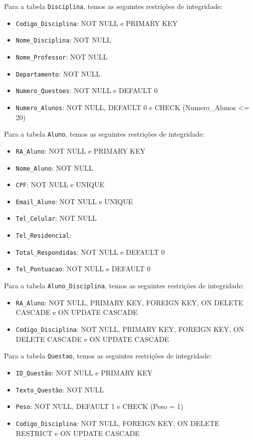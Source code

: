 \documentclass[12pt,a4paper]{article}
\begin{document}
Para a tabela \texttt{Disciplina}, temos as seguintes restrições de integridade:

\begin{itemize}
    \item {\texttt{Codigo\_Disciplina}}: NOT NULL e PRIMARY KEY
    \item {\texttt{Nome\_Disciplina}}: NOT NULL
    \item {\texttt{Nome\_Professor}}: NOT NULL
    \item {\texttt{Departamento}}: NOT NULL
    \item {\texttt{Numero\_Questoes}}: NOT NULL e DEFAULT 0
    \item {\texttt{Numero\_Alunos}}: NOT NULL, DEFAULT 0 e CHECK (Numero\_Alunos <= 20) 
\end{itemize}

Para a tabela \texttt{Aluno}, temos as seguintes restrições de integridade:

\begin{itemize}
    \item {\texttt{RA\_Aluno}}: NOT NULL e PRIMARY KEY
    \item {\texttt{Nome\_Aluno}}: NOT NULL
    \item \texttt{CPF}: NOT NULL e UNIQUE
    \item \texttt{Email\_Aluno}: NOT NULL e UNIQUE
    \item \texttt{Tel\_Celular}: NOT NULL
    \item \texttt{Tel\_Residencial}:
    \item \texttt{Total\_Respondidas}: NOT NULL e DEFAULT 0
    \item \texttt{Tel\_Pontuacao}: NOT NULL e DEFAULT 0
\end{itemize}

Para a tabela \texttt{Aluno\_Disciplina}, temos as seguintes restrições de integridade:

\begin{itemize}
    \item {\texttt{RA\_Aluno}}: NOT NULL, PRIMARY KEY, FOREIGN KEY, ON DELETE CASCADE e ON UPDATE CASCADE
    \item {\texttt{Codigo\_Disciplina}}: NOT NULL, PRIMARY KEY, FOREIGN KEY, ON DELETE CASCADE e ON UPDATE CASCADE
\end{itemize}

Para a tabela \texttt{Questao}, temos as seguintes restrições de integridade:

\begin{itemize}
    \item \texttt{ID\_Questão}: NOT NULL e PRIMARY KEY
    \item \texttt{Texto\_Questão}: NOT NULL
    \item \texttt{Peso}: NOT NULL, DEFAULT 1 e CHECK (Peso = 1)
    \item \texttt{Codigo\_Disciplina}: NOT NULL, FOREIGN KEY, ON DELETE RESTRICT e ON UPDATE CASCADE
\end{itemize}
\end{document}
